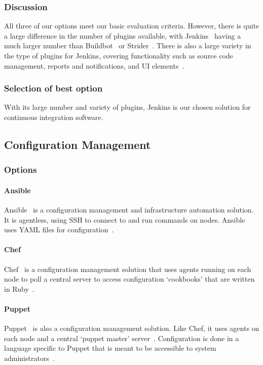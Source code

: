 \documentclass[10pt,letterpaper,onecolumn,draftclsnofoot]{IEEEtran}
\begin{document}
\subsubsection{Discussion}
All three of our options meet our basic evaluation criteria.
However, there is quite a large difference in the number of plugins available, with Jenkins~\cite{jenkinsplugins} having a much larger number than Buildbot~\cite{buildbotplugins} or Strider~\cite{striderplugins}.
There is also a large variety in the type of plugins for Jenkins, covering functionality such as source code management, reports and notifications, and UI elements~\cite{jenkinsplugins}.
\subsubsection{Selection of best option}
With its large number and variety of plugins, Jenkins is our chosen solution for continuous integration software.

\subsection{Configuration Management}
\subsubsection{Options}
\paragraph{Ansible}
Ansible~\cite{ansiblemain} is a configuration management and infrastructure automation solution.
It is agentless, using SSH to connect to and run commands on nodes.
Ansible uses YAML files for configuration~\cite{ansibleworks}.
\paragraph{Chef}
Chef~\cite{chefmain} is a configuration management solution that uses agents running on each node to poll a central server to access configuration `cookbooks' that are written in Ruby~\cite{chefworks}.
\paragraph{Puppet}
Puppet~\cite{puppetmain} is also a configuration management solution.
Like Chef, it uses agents on each node and a central `puppet master' server~\cite{puppetworks}.
Configuration is done in a language specific to Puppet that is meant to be accessible to system administrators~\cite{puppetlang}.
\end{document}
